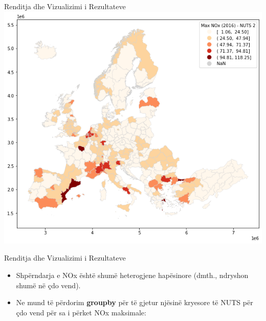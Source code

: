 \documentclass[
  ignorenonframetext,
]{beamer}
\begin{document}
\begin{frame}{Renditja dhe Vizualizimi i Rezultateve}
\protect\hypertarget{renditja-dhe-vizualizimi-i-rezultateve-10}{}
\includegraphics{./Figs/eunox3.png}
\end{frame}

\begin{frame}{Renditja dhe Vizualizimi i Rezultateve}
\protect\hypertarget{renditja-dhe-vizualizimi-i-rezultateve-11}{}
\begin{itemize}
\item
  Shpërndarja e NOx është shumë heterogjene hapësinore (dmth., ndryshon
  shumë në çdo vend).
\item
  Ne mund të përdorim \textbf{groupby} për të gjetur njësinë kryesore të
  NUTS për çdo vend për sa i përket NOx maksimale:
\end{itemize}
\end{frame}
\end{document}
